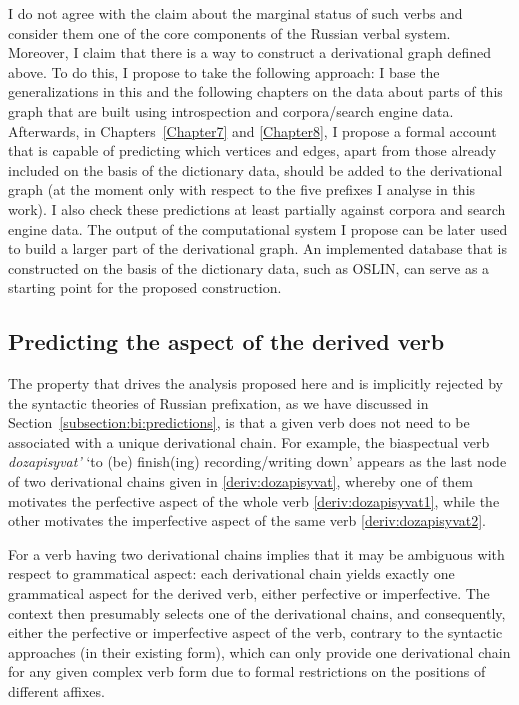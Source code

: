 I do not agree with the claim about the marginal status of such verbs and consider them one of the core components of the Russian verbal system. Moreover, I claim that there is a way to construct a derivational graph defined above. To do this, I propose to take the following approach: I base the generalizations in this and the following chapters on the data about parts of this graph that are built using introspection and corpora/search engine data. Afterwards, in Chapters~\ref{Chapter7} and \ref{Chapter8}, I propose a formal account that is capable of predicting which vertices and edges, apart from those already included on the basis of the dictionary data, should be added to the derivational graph (at the moment only with respect to the five prefixes I analyse in this work). I also check these predictions at least partially against corpora and search engine data. The output of the computational system I propose can be later used to build a larger part of the derivational graph. An implemented database that is constructed on the basis of the dictionary data, such as OSLIN, can serve as a starting point for the proposed construction.

\subsection{Predicting the aspect of the derived verb}\label{subsection:predict}
The property that drives the analysis proposed here and is implicitly rejected by the syntactic theories of Russian prefixation, as we have discussed in Section~\ref{subsection:bi:predictions}, is that a given verb does not need to be associated with a unique derivational chain. For example, the biaspectual verb \textit{dozapisyvat'} `to (be) finish(ing) recording/writing down' appears as the last node of two derivational chains given in \ref{deriv:dozapisyvat}, whereby one of them motivates the perfective aspect of the whole verb \ref{deriv:dozapisyvat1}, while the other motivates the imperfective aspect of the same verb \ref{deriv:dozapisyvat2}.

For a verb having two derivational chains implies that it may be ambiguous with respect to grammatical aspect: each derivational chain yields exactly one grammatical aspect for the derived verb, either perfective or imperfective. The context then presumably selects one of the derivational chains, and consequently, either the perfective or imperfective aspect of the verb, contrary to the syntactic approaches (in their existing form), which can only provide one derivational chain for any given complex verb form due to formal restrictions on the positions of different affixes.

